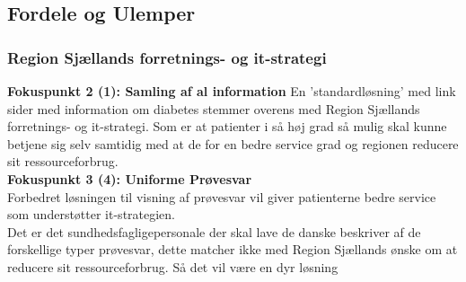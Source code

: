 %
%
%
\subsection{Fordele og Ulemper}
\subsubsection{Region Sjællands forretnings- og it-strategi}
%
\textbf{Fokuspunkt 2 (1): Samling af al information}
En 'standardløsning' med link sider med information om diabetes stemmer overens med Region Sjællands forretnings- og it-strategi. 
Som er at patienter i så høj grad så mulig skal kunne betjene sig selv samtidig med at de for en bedre service grad og regionen reducere sit ressourceforbrug.\\
%
\textbf{Fokuspunkt 3 (4): Uniforme Prøvesvar}\\
Forbedret løsningen til visning af prøvesvar vil giver patienterne bedre service som understøtter it-strategien.\\
Det er det sundhedsfagligepersonale der skal lave de danske beskriver af de forskellige typer prøvesvar, dette matcher ikke med Region Sjællands ønske om at reducere sit ressourceforbrug. Så det vil være en dyr løsning\\
%
